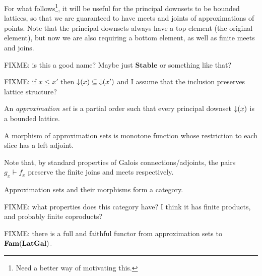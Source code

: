 For what follows\footnote{Need a better way of motivating this.}, it
will be useful for the principal downsets to be bounded lattices, so
that we are guaranteed to have meets and joints of approximations of
points. Note that the principal downsets always have a top element
(the original element), but now we are also requiring a bottom
element, as well as finite meets and joins.

FIXME: is this a good name? Maybe just $\mathbf{Stable}$ or something
like that?

FIXME: if $x \leq x'$ then $\mathop{\downarrow}(x) \subseteq \mathop{\downarrow}(x')$ and I
assume that the inclusion preserves lattice structure?

\begin{definition}
  An \emph{approximation set} is a partial order such that every
  principal downset $\mathop{\downarrow}(x)$ is a bounded lattice.

  A morphism of approximation sets is monotone function whose
  restriction to each slice has a left adjoint.
\end{definition}

Note that, by standard properties of Galois connections/adjoints, the
pairs $g_x \vdash f_x$ preserve the finite joins and meets respectively.

\begin{proposition}
  Approximation sets and their morphisms form a category.
\end{proposition}

FIXME: what properties does this category have? I think it has finite
products, and probably finite coproducts?

FIXME: there is a full and faithful functor from approximation sets to
$\mathbf{Fam}(\mathbf{LatGal})$.
